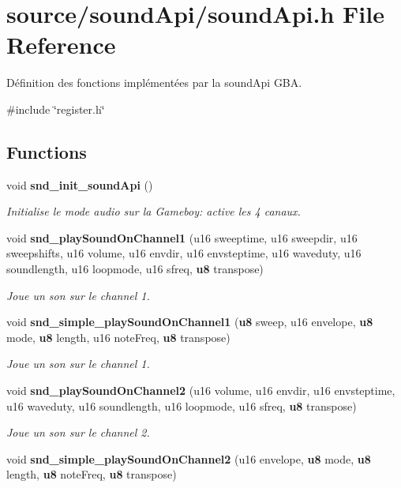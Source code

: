 \section{source/soundApi/soundApi.h File Reference}
\label{sound_api_8h}


Définition des fonctions implémentées par la soundApi GBA.  


{\ttfamily \#include \char`\"{}register.h\char`\"{}}\par
\subsection*{Functions}
\begin{DoxyCompactItemize}
\item 
void {\bf snd\_\-init\_\-soundApi} ()\label{sound_api_8h_a6d8e8eccdda5bf863a0d035dfb6fc8d8}

\begin{DoxyCompactList}\small\item\em Initialise le mode audio sur la Gameboy: active les 4 canaux. \item\end{DoxyCompactList}\item 
void {\bf snd\_\-playSoundOnChannel1} (u16 sweeptime, u16 sweepdir, u16 sweepshifts, u16 volume, u16 envdir, u16 envsteptime, u16 waveduty, u16 soundlength, u16 loopmode, u16 sfreq, {\bf u8} transpose)
\begin{DoxyCompactList}\small\item\em Joue un son sur le channel 1. \item\end{DoxyCompactList}\item 
void {\bf snd\_\-simple\_\-playSoundOnChannel1} ({\bf u8} sweep, u16 envelope, {\bf u8} mode, {\bf u8} length, u16 noteFreq, {\bf u8} transpose)
\begin{DoxyCompactList}\small\item\em Joue un son sur le channel 1. \item\end{DoxyCompactList}\item 
void {\bf snd\_\-playSoundOnChannel2} (u16 volume, u16 envdir, u16 envsteptime, u16 waveduty, u16 soundlength, u16 loopmode, u16 sfreq, {\bf u8} transpose)
\begin{DoxyCompactList}\small\item\em Joue un son sur le channel 2. \item\end{DoxyCompactList}\item 
void {\bfseries snd\_\-simple\_\-playSoundOnChannel2} (u16 envelope, {\bf u8} mode, {\bf u8} length, {\bf u8} noteFreq, {\bf u8} transpose)\label{sound_api_8h_a852c7bab655a7ddb9df785764cb9afd0}


\end{DoxyCompactItemize}

